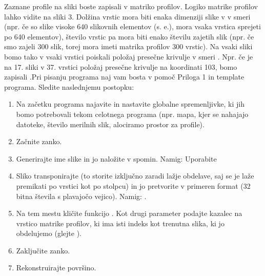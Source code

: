 \documentclass[letterpaper,10pt,english]{sphinxmanual}
\begin{document}
\sphinxAtStartPar
Zaznane profile na sliki boste zapisali v matriko profilov. Logiko matrike profilov lahko vidite na sliki 3.
Dolžina vrstic mora biti enaka dimenziji slike v v smeri (npr. če so slike visoke 640 slikovnih elementov
(s. e.), mora vsaka vrstica sprejeti po 640 elementov), število vrstic pa mora biti enako številu zajetih
slik  (npr. če smo zajeli 300 slik, torej mora imeti matrika profilov 300 vrstic). Na vsaki sliki bomo tako
v vsaki vrstici poiskali položaj presečne krivulje v smeri . Npr. če je na 17. sliki v 37. vrstici položaj
presečne krivulje na koordinati 103, bomo zapisali .Pri pisanju programa naj vam bosta v pomoč Priloga 1 in template programa. Sledite naslednjemu
postopku:
\begin{enumerate}
%
\item {} 
\sphinxAtStartPar
Na začetku programa najavite in nastavite globalne spremenljivke, ki jih bomo potrebovali tekom celotnega programa (npr. mapa, kjer se nahajajo datoteke, število merilnih slik, alociramo prostor za profile).

\item {} 
\sphinxAtStartPar
Začnite zanko.

\item {} 
\sphinxAtStartPar
Generirajte ime slike in jo naložite v spomin. Namig: Uporabite 

\item {} 
\sphinxAtStartPar
Sliko transponirajte (to storite izključno zaradi lažje obdelave, saj se je laže premikati po vrstici kot po stolpcu) in jo pretvorite v primeren format (32 bitna števila s plavajočo vejico). Namig: .

\item {} 
\sphinxAtStartPar
Na tem mestu kličite funkcijo . Kot drugi parameter podajte kazalec na vrstico matrike profilov, ki ima isti indeks kot trenutna slika, ki jo obdelujemo (glejte ).

\item {} 
\sphinxAtStartPar
Zaključite zanko.

\item {} 
\sphinxAtStartPar
Rekonstruirajte površino.

\end{enumerate}
\end{document}

